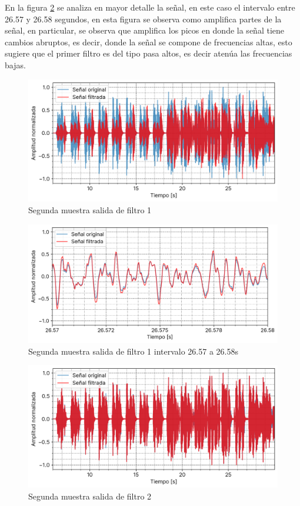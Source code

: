 \documentclass[12pt]{article}
\begin{document}
En la figura \ref{cancion2_6s_filter1_output_compare_26_57_a_26_58} se analiza
en mayor detalle la señal, en este caso el intervalo entre 26.57 y 26.58
segundos, en esta figura se observa como amplifica partes de la señal, en
particular, se observa que amplifica los picos en donde la señal tiene cambios
abruptos, es decir, donde la señal se compone de frecuencias altas, esto sugiere
que el primer filtro es del tipo pasa altos, es decir atenúa las frecuencias
bajas.

\begin{figure}
\centering
\includegraphics{plot/cancion2_6s_filter1_output_compare.png}
\caption{Segunda muestra salida de filtro 1}
\label{cancion2_filter1_output_compare}
\end{figure}

\begin{figure}
\centering
\includegraphics{plot/cancion2_6s_filter1_output_compare_26_57_a_26_58.png}
\caption{Segunda muestra salida de filtro 1 intervalo 26.57 a 26.58s}
\label{cancion2_6s_filter1_output_compare_26_57_a_26_58}
\end{figure}

\begin{figure}
\centering
\includegraphics{plot/cancion2_6s_filter2_output_compare.png}
\caption{Segunda muestra salida de filtro 2}
\label{cancion2_filter2_output_compare}
\end{figure}
\end{document}
